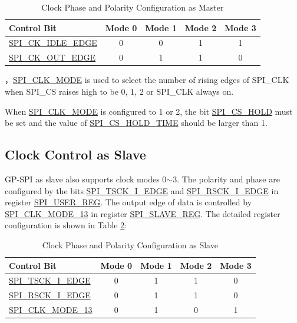 \documentclass[main\_\_EN.tex]{subfiles}
\begin{document}
\begin{table}[H]
    \centering
    \caption{Clock Phase and Polarity Configuration as Master}
    \label{table:clock_pol_master}
    \begin{tabular}[c]{|p{3.5cm}|c|c|c|c|}
    \hline
    \rowcolor{lightgray}
    \textbf{Control Bit} & \textbf{Mode 0} & \textbf{Mode 1} & \textbf{Mode 2} & \textbf{Mode 3}\\
    \hline
   \hyperref[fielddesc:SPICKIDLEEDGE]{SPI\_CK\_IDLE\_EDGE}  & 0     & 0     & 1     & 1\\
    \hline
   \hyperref[fielddesc:SPICKOUTEDGE]{SPI\_CK\_OUT\_EDGE}   & 0     & 1     & 1     & 0\\
    \hline
    \end{tabular}
\end{table}

，\hyperref[fielddesc:SPICLKMODE]{SPI\_CLK\_MODE} is used to select the number of rising edges of SPI\_CLK when SPI\_CS raises high to be 0, 1, 2 or SPI\_CLK always on.

\begin{tiplisting}
 When \hyperref[fielddesc:SPICLKMODE]{SPI\_CLK\_MODE} is configured to 1 or 2, the bit \hyperref[fielddesc:SPICSHOLD]{SPI\_CS\_HOLD} must be set and the value of \hyperref[fielddesc:SPICSHOLDTIME]{SPI\_CS\_HOLD\_TIME} should be larger than 1.
\end{tiplisting}
\vspace{-1em}

\subsection{Clock Control as Slave}\label{GP-SPI slave clock control}

GP-SPI as slave also supports clock modes 0$\sim$3. The polarity and phase are configured by the bits \hyperref[fielddesc:SPITSCKIEDGE]{SPI\_TSCK\_I\_EDGE} and \hyperref[fielddesc:SPIRSCKIEDGE]{SPI\_RSCK\_I\_EDGE} in register \hyperref[regdesc:SPIUSERREG]{SPI\_USER\_REG}. The output edge of data is controlled by \hyperref[fielddesc:SPICLKMODE13]{SPI\_CLK\_MODE\_13} in register \hyperref[regdesc:SPISLAVEREG]{SPI\_SLAVE\_REG}. The detailed register configuration is shown in Table \ref{table:clock_pol_slave}:

\begin{table}[H]
    \centering
    \caption{Clock Phase and Polarity Configuration as Slave}
    \label{table:clock_pol_slave}
    \begin{tabular}[c]{|p{3.5cm}|c|c|c|c|}
    \hline
    \rowcolor{lightgray}
    \textbf{Control Bit} & \textbf{Mode 0} & \textbf{Mode 1} & \textbf{Mode 2} & \textbf{Mode 3}\\
    \hline
   \hyperref[fielddesc:SPITSCKIEDGE]{SPI\_TSCK\_I\_EDGE}   & 0 & 1 & 1 & 0\\
    \hline
   \hyperref[fielddesc:SPIRSCKIEDGE]{SPI\_RSCK\_I\_EDGE}   & 0 & 1 & 1 & 0\\
    \hline
   \hyperref[fielddesc:SPICLKMODE13]{SPI\_CLK\_MODE\_13}     & 0 & 1 & 0 & 1\\
    \hline
    \end{tabular}
\end{table}
\end{document}
